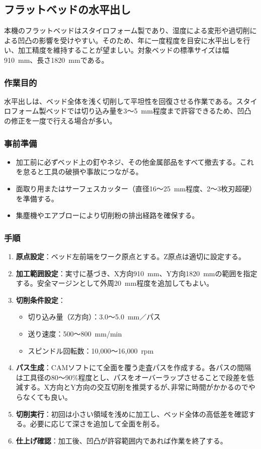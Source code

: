 \documentclass[uplatex,dvipdfmx]{ujarticle}
\begin{document}
\subsection{フラットベッドの水平出し}

本機のフラットベッドはスタイロフォーム製であり、湿度による変形や過切削による凹凸の影響を受けやすい。そのため、年に一度程度を目安に水平出しを行い、加工精度を維持することが望ましい。対象ベッドの標準サイズは幅910~mm、長さ1820~mmである。

\subsubsection*{作業目的}
水平出しは、ベッド全体を浅く切削して平坦性を回復させる作業である。スタイロフォーム製ベッドでは切り込み量を3～5~mm程度まで許容できるため、凹凸の修正を一度で行える場合が多い。

\subsubsection*{事前準備}
\begin{itemize}
    \item 加工前に必ずベッド上の釘やネジ、その他金属部品をすべて撤去する。これを怠ると工具の破損や事故につながる。
    \item 面取り用またはサーフェスカッター（直径16～25~mm程度、2～3枚刃超硬）を準備する。
    \item 集塵機やエアブローにより切削粉の排出経路を確保する。
\end{itemize}

\subsubsection*{手順}
\begin{enumerate}
    \item \textbf{原点設定}：ベッド左前端をワーク原点とする。Z原点は適切に設定する。
    \item \textbf{加工範囲設定}：実寸に基づき、X方向910~mm、Y方向1820~mmの範囲を指定する。安全マージンとして外周20~mm程度を追加してもよい。
    \item \textbf{切削条件設定}：
    \begin{itemize}
        \item 切り込み量（Z方向）：3.0～5.0~mm／パス
        \item 送り速度：500～800~mm/min
        \item スピンドル回転数：10,000～16,000~rpm
    \end{itemize}
    \item \textbf{パス生成}：CAMソフトにて全面を覆う走査パスを作成する。各パスの間隔は工具径の80～90\%程度とし、パスをオーバーラップさせることで段差を低減する。X方向とY方向の交互切削を推奨するが､非常に時間がかかるのでやらなくても良い。
    \item \textbf{切削実行}：初回は小さい領域を浅めに加工し、ベッド全体の高低差を確認する。必要に応じて深さを追加して全面を削る。
    \item \textbf{仕上げ確認}：加工後、凹凸が許容範囲内であれば作業を終了する。
\end{enumerate}
\end{document}

